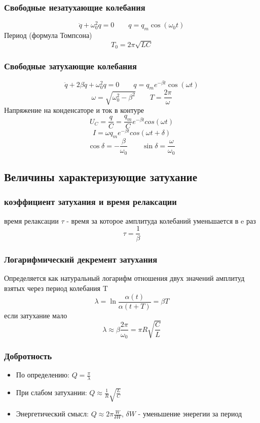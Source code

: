 \documentclass{article}
\begin{document}
\subsubsection{Свободные незатухающие колебания}
\[\ddot{q} + \omega_0^2q = 0 \qquad q= q_m\cos(\omega_0t)\]
Период (формула Томпсона)
\[T_0 = 2\pi\sqrt{LC}\]
\subsubsection{Свободные затухающие колебания}
\[\ddot{q} + 2\beta\dot{q} + \omega_0^2q = 0 \qquad q= q_m e^{-\beta t} \cos(\omega t)\]
\[\omega = \sqrt{\omega_0^2 - \beta^2} \qquad T = \frac{2\pi}{\omega}\]
Напряжение на конденсаторе и ток в контуре
\[U_C = \frac{q}{C} = \frac{q_m}{C}e^{-\beta t}cos(\omega t)\]
\[I = \omega q_m e ^ {-\beta t} cos(\omega t + \delta)\]
\[\cos\delta=-\frac{\beta}{\omega_0} \qquad \sin\delta=\frac{\omega}{\omega_0}\]
\subsection{Величины характеризующие затухание}
\subsubsection{коэффициент затухания и время релаксации}
время релаксации  $\tau$ - время за которое амплитуда колебаний уменьшается в e раз
\[\tau = \frac{1}{\beta}\]
\subsubsection{Логарифмический декремент затухания}
Определяется как натуральный логарифм отношения двух значений амплитуд взятых через период колебания T
\[\lambda = \ln{\frac{\alpha(t)}{\alpha(t + T)}} = \beta T\]
если затухание мало 
\[\lambda \approx \beta \frac{2\pi}{\omega_0} = \pi R \sqrt{\frac{C}{L}}\]
\subsubsection{Добротность}
\begin{itemize}
    \item По определению: $Q = \frac{\pi}{\lambda}$
    \item При слабом затухании: $Q \approx \frac{1}{R}\sqrt{\frac{L}{C}}$
    \item Энергетический смысл: $Q \approx 2\pi \frac{W}{\delta W}$, $\delta W$ - уменьшение энерегии за период
\end{itemize}
\end{document}
